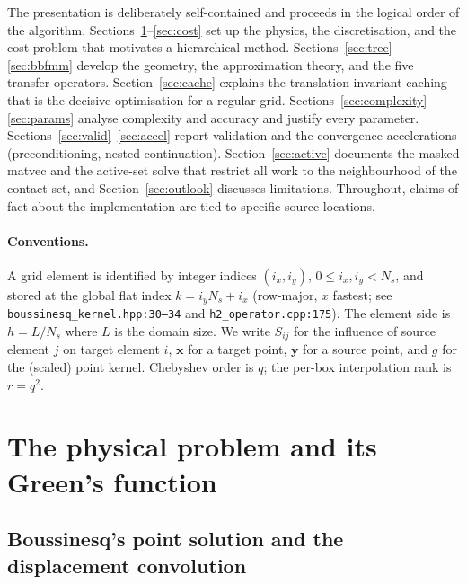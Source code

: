 \documentclass[11pt,a4paper]{article}
\newcommand{\xx}{\mathbf{x}}
\newcommand{\yy}{\mathbf{y}}
\newcommand{\code}[1]{\texttt{#1}}
\theoremstyle{definition}
\theoremstyle{remark}
\begin{document}
The presentation is deliberately self-contained and proceeds in the logical
order of the algorithm. Sections~\ref{sec:physics}--\ref{sec:cost} set up the
physics, the discretisation, and the cost problem that motivates a hierarchical
method. Sections~\ref{sec:tree}--\ref{sec:bbfmm} develop the geometry, the
approximation theory, and the five transfer operators. Section~\ref{sec:cache}
explains the translation-invariant caching that is the decisive optimisation
for a regular grid. Sections~\ref{sec:complexity}--\ref{sec:params} analyse
complexity and accuracy and justify every parameter.
Sections~\ref{sec:valid}--\ref{sec:accel} report validation and the
convergence accelerations (preconditioning, nested continuation).
Section~\ref{sec:active} documents the masked matvec and the active-set
solve that restrict all work to the neighbourhood of the contact set, and
Section~\ref{sec:outlook} discusses limitations. Throughout, claims of fact
about the implementation are tied to specific source locations.

\paragraph{Conventions.}
A grid element is identified by integer indices $(i_x,i_y)$, $0\le i_x,i_y<N_s$,
and stored at the global flat index $k=i_y N_s + i_x$ (row-major, $x$ fastest;
see \code{boussinesq\_kernel.hpp:30--34} and \code{h2\_operator.cpp:175}). The
element side is $h=L/N_s$ where $L$ is the domain size. We write $S_{ij}$ for the
influence of source element $j$ on target element $i$, $\xx$ for a target point,
$\yy$ for a source point, and $g$ for the (scaled) point kernel. Chebyshev order
is $q$; the per-box interpolation rank is $r=q^2$.

\section{The physical problem and its Green's function}
\label{sec:physics}

\subsection{Boussinesq's point solution and the displacement convolution}
\end{document}
